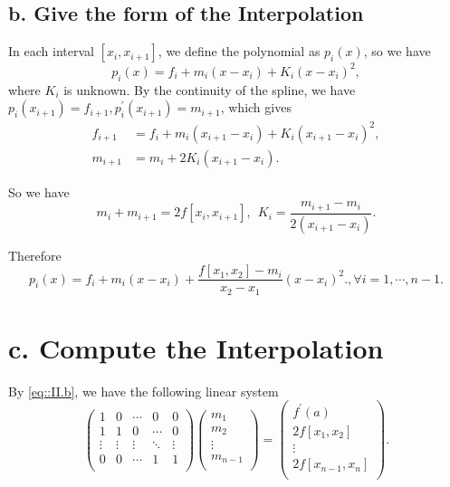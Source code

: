 \documentclass[a4paper]{article}
\begin{document}
\subsection*{b. Give the form of the Interpolation}

In each interval $ [x_{i}, x_{i+1}] $, we define the polynomial as $ p_i(x) $, so we have
\begin{equation}
    p_i(x) = f_i + m_i (x-x_i) + K_i(x-x_i)^{2},
\end{equation}
where $ K_i $ is unknown. By the continuity of the spline, we have $ p_i(x _{i+1}) = f _{i+1}, p_i ^{\prime}(x _{i+1}) = m _{i+1}$, which gives
\begin{equation}
    \begin{aligned}
        f_{i+1} &= f_i + m_i (x_{i+1}-x_i) + K_i(x_{i+1}-x_i) ^{2},\\
        m_{i+1} &= m_i + 2K_i(x_{i+1}-x_i).
    \end{aligned}
\end{equation}

So we have 
\begin{equation}
    m_i + m _{i+1} = 2 f[x _{i}, x _{i+1}], ~~ K_i = \frac{m_{i+1} - m_{i}}{2(x_{i+1}-x_i)}.
    \label{eq::II.b}
\end{equation}

Therefore
\begin{equation}
    p_i(x) = f_i + m_i (x-x_i) + \frac{f[x_1,x_2] - m_i}{x_2-x_1} (x-x_i) ^{2}., \forall i = 1, \cdots, n-1.
\end{equation}

\section*{c. Compute the Interpolation}

By \eqref{eq::II.b}, we have the following linear system
\begin{equation}
    \begin{pmatrix}
        1 & 0 & \cdots & 0 & 0\\
        1 & 1 & 0 & \cdots & 0\\
        \vdots & \vdots & \vdots & \ddots & \vdots\\
        0 & 0 & \cdots & 1 & 1\\
    \end{pmatrix}
    \begin{pmatrix}
        m_1\\
        m_2\\
        \vdots\\
        m_{n-1}\\
    \end{pmatrix}
    =
    \begin{pmatrix}
        f ^{\prime} (a) \\
        2f[x_1, x_2]\\
        \vdots\\
        2f[x_{n-1}, x_n]\\
    \end{pmatrix}.
    \label{eq::II.c}
\end{equation}
\end{document}
